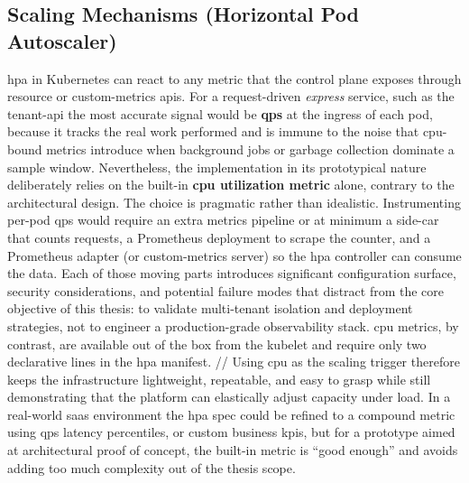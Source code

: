 \documentclass[11pt, a4paper, oneside, listof=totoc]{scrartcl}
\begin{document}
        \subsection[Scaling Mechanisms]{Scaling Mechanisms (Horizontal Pod Autoscaler)}\label{subsec:scaling}
            \gls{hpa} in Kubernetes can react to any metric that the control plane exposes through
            resource or custom-metrics \glspl{api}.
            For a request-driven \textit{express} service, such as the tenant-\gls{api} the most
            accurate signal would be \textbf{\gls{qps}} at the ingress of each pod, because it
            tracks the real work performed and is immune to the noise that \gls{cpu}-bound metrics
            introduce when background jobs or garbage collection dominate a sample window.
            Nevertheless, the implementation in its prototypical nature deliberately relies on the
            built-in \textbf{\gls{cpu} utilization metric} alone, contrary to the architectural
            design.
            The choice is pragmatic rather than idealistic.
            Instrumenting per-pod \gls{qps} would require an extra metrics pipeline or at minimum a
            side-car that counts requests, a Prometheus deployment to scrape the counter, and a
            Prometheus adapter (or custom-metrics server) so the \gls{hpa} controller can consume
            the data.
            Each of those moving parts introduces significant configuration surface, security
            considerations, and potential failure modes that distract from the core objective of
            this thesis: to validate multi-tenant isolation and deployment strategies, not to
            engineer a production-grade observability stack.
            \gls{cpu} metrics, by contrast, are available out of the box from the kubelet and
            require only two declarative lines in the \gls{hpa} manifest.
            //
            Using \gls{cpu} as the scaling trigger therefore keeps the infrastructure lightweight,
            repeatable, and easy to grasp while still demonstrating that the platform can
            elastically adjust capacity under load.
            In a real-world \gls{saas} environment the \gls{hpa} spec could be refined to a compound
            metric using \gls{qps} latency percentiles, or custom business \glspl{kpi}, but for a
            prototype aimed at architectural proof of concept, the built-in metric is
            \enquote{good enough} and avoids adding too much complexity out of the thesis scope.

            \cleardoublepage
\end{document}
